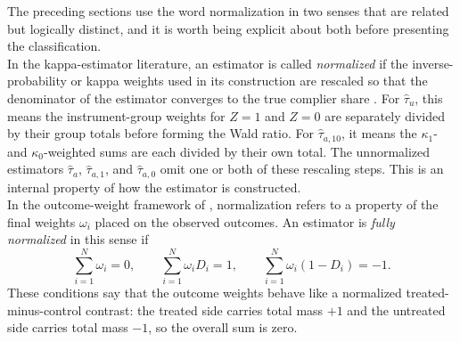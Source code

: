 \documentclass[12pt, a4paper, oneside]{article}
\theoremstyle{plain}
\theoremstyle{definition}
\begin{document}
The preceding sections use the word normalization in two senses that are related but
logically distinct, and it is worth being explicit about both before presenting the
classification.\\
In the kappa-estimator literature, an estimator is called \emph{normalized} if the
inverse-probability or kappa weights used in its construction are rescaled so that the
denominator of the estimator converges to the true complier share
\citep{sloczynski2025abadie}. For $\hat\tau_u$, this means the instrument-group weights
for $Z=1$ and $Z=0$ are separately divided by their group totals before forming the
Wald ratio. For $\hat\tau_{a,10}$, it means the $\kappa_1$- and $\kappa_0$-weighted
sums are each divided by their own total. The unnormalized estimators $\hat\tau_a$,
$\hat\tau_{a,1}$, and $\hat\tau_{a,0}$ omit one or both of these rescaling steps.
This is an internal property of how the estimator is constructed.\\
In the outcome-weight framework of \citet{knaus2024treatment}, normalization refers to
a property of the final weights $\omega_i$ placed on the observed outcomes. An estimator
is \emph{fully normalized} in this sense if
\begin{equation}
  \sum_{i=1}^N \omega_i = 0,
  \qquad
  \sum_{i=1}^N \omega_i D_i = 1,
  \qquad
  \sum_{i=1}^N \omega_i (1-D_i) = -1.
  \label{eq:full_norm_conditions}
\end{equation}
These conditions say that the outcome weights behave like a normalized
treated-minus-control contrast: the treated side carries total mass $+1$ and the
untreated side carries total mass $-1$, so the overall sum is zero.
\end{document}
